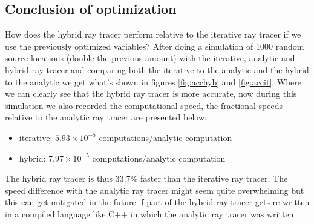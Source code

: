 \subsection{Conclusion of optimization}
How does the hybrid ray tracer perform relative to the iterative ray tracer if we use 
the previously optimized variables? After doing a simulation of 1000 random source locations (double the previous amount) with
the iterative, analytic and hybrid ray tracer and comparing both the iterative to the analytic and the hybrid to the analytic
we get what's shown in figures \ref{fig:acchyb} and \ref{fig:accit}. Where we can clearly see that the hybrid
ray tracer is more accurate, now during this simulation we also recorded the computational speed, the fractional
speeds relative to the analytic ray tracer are presented below:
\begin{itemize}
	\item iterative: $5.93 \times 10^{-5}$ computations/analytic computation
	\item hybrid: $7.97 \times 10^{-5}$ computations/analytic computation
\end{itemize}
The hybrid ray tracer is thus 33.7\% faster than the iterative ray
tracer. The speed difference with the analytic ray tracer might seem
quite overwhelming but this can get mitigated in the future if part
of the hybrid ray tracer gets re-written in a compiled language
like C++ in which the analytic ray tracer was written.

